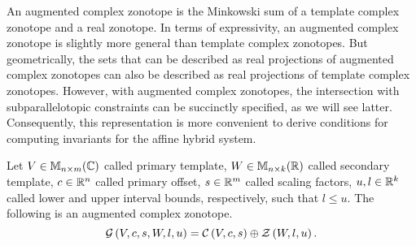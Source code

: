 An augmented complex zonotope is the Minkowski sum of a template
complex zonotope and a real zonotope. In terms of expressivity, an
augmented complex zonotope is slightly more general than template
complex zonotopes.  But geometrically, the sets that can be described
as real projections of augmented complex zonotopes can also be
described as real projections of template complex zonotopes.  However,
with augmented complex zonotopes, the intersection with
subparallelotopic constraints can be succinctly specified, as we will
see latter. Consequently, this representation is more convenient to
derive conditions for computing invariants for the affine hybrid
system.
%
\begin{definition}
Let $V\in\mathbb{M}_{n\times m}(\mathbb{C})$ called primary template, $W\in\mathbb{M}_{n\times k}(\mathbb{R})$
called secondary template, $c\in\mathbb{R}^n$ called primary offset,
$s\in\mathbb{R}^m$ called scaling factors, $u,l\in\mathbb{R}^k$ called lower
and upper interval bounds, respectively, such that $l\leq u$.  The
following is an augmented complex
zonotope.
\begin{equation*}
\mathcal{G}\left(V,c,s,W,l,u\right) = \mathcal{C}\left(V,c,s\right)\oplus\mathcal{Z}\left(W,l,u\right).
\end{equation*}
\end{definition}
%
